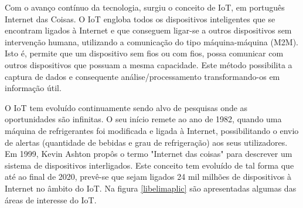 







Com o avanço contínuo da tecnologia, surgiu o conceito de \ac{IoT}, em português Internet das Coisas. O \ac{IoT} engloba todos os dispositivos inteligentes que se encontram ligados à Internet e que conseguem ligar-se a outros dispositivos sem intervenção humana, utilizando a comunicação do tipo máquina-máquina (M2M). Isto é, permite que um dispositivo sem fios ou com fios, possa comunicar com outros dispositivos que possuam a mesma capacidade. Este método possibilita a captura de dados e consequente análise/processamento transformando-os em informação útil\cite{Li2015}. 

	O IoT tem evoluído continuamente sendo alvo de pesquisas onde as oportunidades são infinitas. O seu início remete ao ano de 1982, quando uma máquina de refrigerantes foi modificada e ligada à Internet, possibilitando o envio de alertas (quantidade de bebidas e grau de refrigeração) aos seus utilizadores\cite{Farooq2015}. Em 1999, Kevin Ashton propôs o termo "Internet das coisas" para descrever um sistema de dispositivos interligados\cite{KevinAshton}. Este conceito tem evoluído de tal forma que até ao final de 2020, prevê-se que sejam ligados 24 mil milhões de dispositivos à Internet no âmbito do \acl{IoT}\cite{Rivera2014}. Na figura \ref{libelimaplic} são apresentadas algumas das áreas de interesse do \ac{IoT}\cite{Gubbi2013}. 
	

